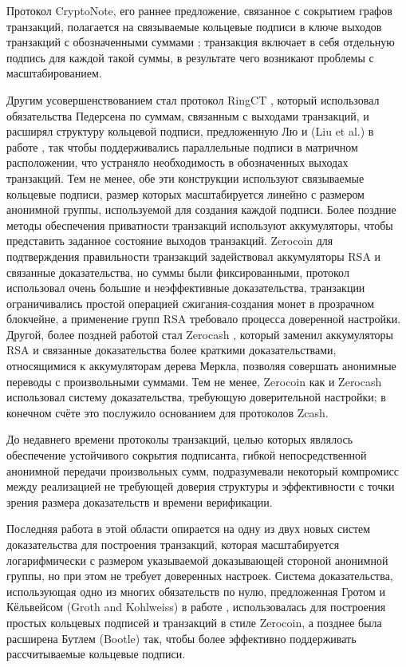 \documentclass{article}
\theoremstyle{definition}
\begin{document}
Протокол CryptoNote, его раннее предложение, связанное с сокрытием графов транзакций, полагается на связываемые кольцевые подписи в ключе выходов транзакций с обозначенными суммами \cite{cryptonote}; транзакция включает в себя отдельную подпись для каждой такой суммы, в результате чего возникают проблемы с масштабированием.

Другим усовершенствованием стал протокол RingCT \cite{ringct}, который использовал обязательства Педерсена по суммам, связанным с выходами транзакций, и расширял структуру кольцевой подписи, предложенную Лю и  (Liu et al.) в работе \cite{liu}, так чтобы поддерживались параллельные подписи в матричном расположении, что устраняло необходимость в обозначенных выходах транзакций.
Тем не менее, обе эти конструкции используют связываемые кольцевые подписи, размер которых масштабируется линейно с размером анонимной группы, используемой для создания каждой подписи.
Более поздние методы обеспечения приватности транзакций используют аккумуляторы, чтобы представить заданное состояние выходов транзакций.
Zerocoin \cite{zerocoin} для подтверждения правильности транзакций задействовал аккумуляторы RSA и связанные доказательства, но суммы были фиксированными, протокол использовал очень большие и неэффективные доказательства, транзакции ограничивались простой операцией сжигания-создания монет в прозрачном блокчейне, а применение групп RSA требовало процесса доверенной настройки.
Другой, более поздней работой стал Zerocash \cite{zerocash}, который заменил аккумуляторы RSA и связанные доказательства более краткими доказательствами, относящимися к аккумуляторам дерева Меркла, позволяя совершать анонимные переводы с произвольными суммами.
Тем не менее, Zerocoin как и Zerocash использовал систему доказательства, требующую доверительной настройки; в конечном счёте это послужило основанием для протоколов Zcash.

До недавнего времени протоколы транзакций, целью которых являлось обеспечение устойчивого сокрытия подписанта, гибкой непосредственной анонимной передачи произвольных сумм, подразумевали некоторый компромисс между реализацией не требующей доверия структуры и эффективности с точки зрения размера доказательств и времени верификации.

Последняя работа в этой области опирается на одну из двух новых систем доказательства для построения транзакций, которая масштабируется логарифмически с размером указываемой доказывающей стороной анонимной группы, но при этом не требует доверенных настроек. Система доказательства, использующая одно из многих обязательств по нулю, предложенная Гротом и Кёльвейсом (Groth and Kohlweiss) в работе \cite{groth}, использовалась для построения простых кольцевых подписей и транзакций в стиле Zerocoin, а позднее была расширена Бутлем (Bootle) \cite{bootle} так, чтобы более эффективно поддерживать рассчитываемые кольцевые подписи.
\end{document}
